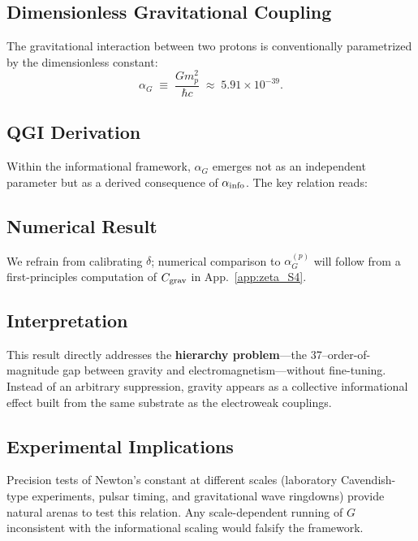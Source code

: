 \documentclass{article}
\numberwithin{equation}{section}
\theoremstyle{plain}
\theoremstyle{definition}
\theoremstyle{remark}
\begin{document}
\subsection{Dimensionless Gravitational Coupling}
The gravitational interaction between two protons is conventionally parametrized by the dimensionless constant:
\begin{equation}
\alpha_G \;\equiv\; \frac{G m_p^2}{\hbar c} \;\approx\; 5.91 \times 10^{-39}.
\end{equation}

\subsection{QGI Derivation}
Within the informational framework, $\alpha_G$ emerges not as an independent parameter but as a derived consequence of $\alpha_{\rm info}$. 
The key relation reads:

\subsection{Numerical Result}
We refrain from calibrating $\delta$; numerical comparison to $\alpha_G^{(p)}$ will follow from a first-principles computation of $C_{\rm grav}$ in App.~\ref{app:zeta_S4}.

\subsection{Interpretation}
This result directly addresses the \textbf{hierarchy problem}—the 37–order-of-magnitude gap between gravity and electromagnetism—without fine-tuning.  
Instead of an arbitrary suppression, gravity appears as a collective informational effect built from the same substrate as the electroweak couplings.  


\subsection{Experimental Implications}
Precision tests of Newton's constant at different scales (laboratory Cavendish-type experiments, pulsar timing, and gravitational wave ringdowns) provide natural arenas to test this relation.  
Any scale-dependent running of $G$ inconsistent with the informational scaling would falsify the framework.
\end{document}
